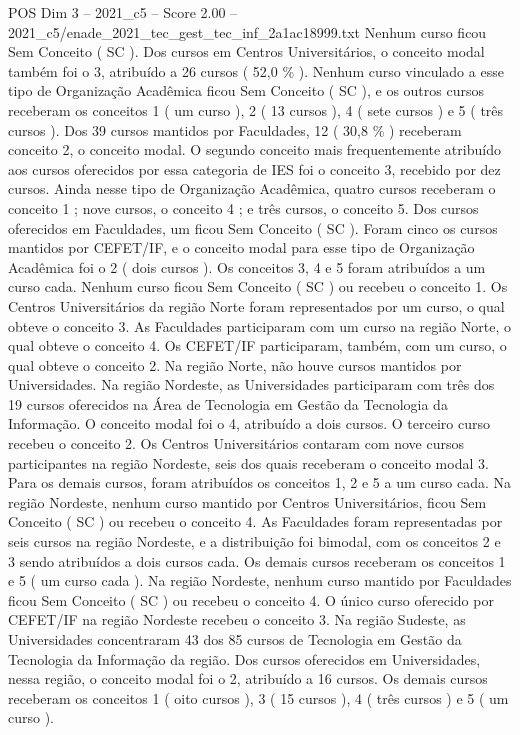 \begin{textsample}{POS Dim 3 – 2021\_c5 – Score 2.00 – 2021\_c5/enade\_2021\_tec\_gest\_tec\_inf\_2a1ac18999.txt}
Nenhum curso ficou Sem Conceito ( SC ).
Dos cursos em Centros Universitários, o conceito modal também foi o 3, atribuído a 26 cursos ( 52,0 \% ).
Nenhum curso vinculado a esse tipo de Organização Acadêmica ficou Sem Conceito ( SC ), e os outros cursos receberam os conceitos 1 ( um curso ), 2 ( 13 cursos ), 4 ( sete cursos ) e 5 ( três cursos ).
Dos 39 cursos mantidos por Faculdades, 12 ( 30,8 \% ) receberam conceito 2, o conceito modal.
O segundo conceito mais frequentemente atribuído aos cursos oferecidos por essa categoria de IES foi o conceito 3, recebido por dez cursos.
Ainda nesse tipo de Organização Acadêmica, quatro cursos receberam o conceito 1 ; nove cursos, o conceito 4 ; e três cursos, o conceito 5.
Dos cursos oferecidos em Faculdades, um ficou Sem Conceito ( SC ).
Foram cinco os cursos mantidos por CEFET/IF, e o conceito modal para esse tipo de Organização Acadêmica foi o 2 ( dois cursos ).
Os conceitos 3, 4 e 5 foram atribuídos a um curso cada.
Nenhum curso ficou Sem Conceito ( SC ) ou recebeu o conceito 1.
Os Centros Universitários da região Norte foram representados por um curso, o qual obteve o conceito 3.
As Faculdades participaram com um curso na região Norte, o qual obteve o conceito 4.
Os CEFET/IF participaram, também, com um curso, o qual obteve o conceito 2.
Na região Norte, não houve cursos mantidos por Universidades.
Na região Nordeste, as Universidades participaram com três dos 19 cursos oferecidos na Área de Tecnologia em Gestão da Tecnologia da Informação.
O conceito modal foi o 4, atribuído a dois cursos.
O terceiro curso recebeu o conceito 2.
Os Centros Universitários contaram com nove cursos participantes na região Nordeste, seis dos quais receberam o conceito modal 3.
Para os demais cursos, foram atribuídos os conceitos 1, 2 e 5 a um curso cada.
Na região Nordeste, nenhum curso mantido por Centros Universitários, ficou Sem Conceito ( SC ) ou recebeu o conceito 4.
As Faculdades foram representadas por seis cursos na região Nordeste, e a distribuição foi bimodal, com os conceitos 2 e 3 sendo atribuídos a dois cursos cada.
Os demais cursos receberam os conceitos 1 e 5 ( um curso cada ).
Na região Nordeste, nenhum curso mantido por Faculdades ficou Sem Conceito ( SC ) ou recebeu o conceito 4.
O único curso oferecido por CEFET/IF na região Nordeste recebeu o conceito 3.
Na região Sudeste, as Universidades concentraram 43 dos 85 cursos de Tecnologia em Gestão da Tecnologia da Informação da região.
Dos cursos oferecidos em Universidades, nessa região, o conceito modal foi o 2, atribuído a 16 cursos.
Os demais cursos receberam os conceitos 1 ( oito cursos ), 3 ( 15 cursos ), 4 ( três cursos ) e 5 ( um curso ).

\end{textsample}

